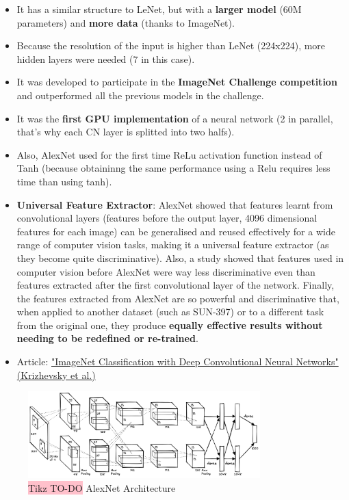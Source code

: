 \begin{itemize}
    \item It has a similar structure to LeNet, but with a \textbf{larger model} (60M parameters) and \textbf{more data} (thanks to ImageNet).
    \item Because the resolution of the input is higher than LeNet (224x224), more hidden layers were needed (7 in this case).
    \item It was developed to participate in the \textbf{ImageNet Challenge competition} and outperformed all the previous models in the challenge.
    \item It was the \textbf{first GPU implementation} of a neural network (2 in parallel, that's why each CN layer is splitted into two halfs).
    \item Also, AlexNet used for the first time ReLu activation function instead of Tanh (because obtaininng the same performance using a Relu requires less time than using tanh).
    \item \textbf{Universal Feature Extractor}: AlexNet showed that features learnt from convolutional layers (features before the output layer, 4096 dimensional features for each image) can be generalised and reused effectively for a wide range of computer vision tasks, making it a universal feature extractor (as they become quite discriminative). Also, a study showed that features used in computer vision before AlexNet were way less discriminative even than features extracted after the first convolutional layer of the network. Finally, the features extracted from AlexNet are so powerful and discriminative that, when applied to another dataset (such as SUN-397) or to a different task from the original one, they produce \textbf{equally effective results without needing to be redefined or re-trained}.
    \item Article: \href{https://papers.nips.cc/paper/4824-imagenet-classification-with-deep-convolutional-neural-networks.pdf}{"ImageNet Classification with Deep Convolutional Neural Networks" (Krizhevsky et al.)}
\end{itemize}

\begin{figure}[!htbp]
    \centering
    \includegraphics[width=0.8\textwidth]{tikz/chapter5 - AlexNet.png}
    \caption{{\color{red}\colorbox{pink}{Tikz TO-DO}} AlexNet Architecture}
\end{figure}


